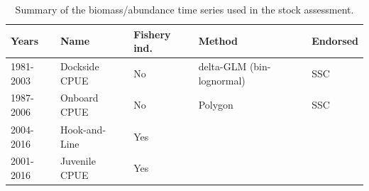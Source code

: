 \documentclass[12pt,]{article}
\begin{document}
\begin{table}[ht]
\centering
\caption{Summary of the biomass/abundance
                                              time series used in the stock
                                              assessment.} 
\label{tab:Index_summary_S}
\begin{tabular}{lllll}
  \hline
Years & Name & Fishery ind. & Method & Endorsed \\ 
  \hline
1981-2003 & Dockside CPUE & No & delta-GLM (bin-lognormal) & SSC \\ 
  1987-2006 & Onboard CPUE & No & Polygon & SSC \\ 
  2004-2016 & Hook-and-Line & Yes &  &  \\ 
  2001-2016 & Juvenile CPUE & Yes &  &  \\ 
   \hline
\end{tabular}
\end{table}

\newpage
\end{document}
